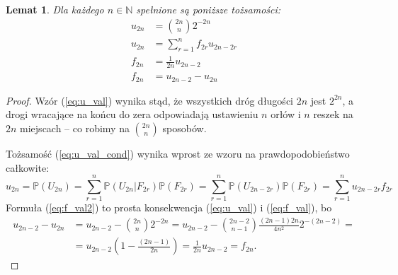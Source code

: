 \documentclass[a4paper,11pt,oneside]{book}
\newcommand{\Prob}{\mathbb{P}}
\newtheorem{lemat}[twier]{Lemat}
\begin{document}
\begin{lemat}
 \label{lem:uf_val}
 Dla każdego $n \in \mathbb{N}$ spełnione są poniższe tożsamości:
 \begin{align}
  u_{2n} &= \binom{2n}{n}2^{-2n}   \label{eq:u_val}\\
  u_{2n} &= \sum_{r=1}^n f_{2r} u_{2n-2r}   \label{eq:u_val_cond}\\
  f_{2n} &= \frac{1}{2n} u_{2n-2} \label{eq:f_val}\\
  f_{2n} &= u_{2n-2} - u_{2n} \label{eq:f_val2}
 \end{align}
\end{lemat}
\begin{proof}
 Wzór (\ref{eq:u_val}) wynika stąd, że wszystkich dróg długości $2n$ jest $2^{2n}$, a drogi wracające na końcu do zera odpowiadają ustawieniu $n$ orłów i $n$ reszek na $2n$ miejscach -- co robimy na $\binom{2n}{n}$ sposobów.
 
 Tożsamość (\ref{eq:u_val_cond}) wynika wprost ze wzoru na prawdopodobieństwo całkowite:
 \[ u_{2n} = \Prob(U_{2n}) = \sum_{r=1}^n \Prob(U_{2n}|F_{2r}) \Prob(F_{2r}) = \sum_{r=1}^n \Prob(U_{2n-2r}) \Prob(F_{2r}) = \sum_{r=1}^n u_{2n-2r}f_{2r}  \]
 Formuła (\ref{eq:f_val2}) to prosta konsekwencja (\ref{eq:u_val}) i (\ref{eq:f_val}), bo
 \begin{equation*}
 \begin{split}
    u_{2n-2} - u_{2n} &= u_{2n-2} - \binom{2n}{n}2^{-2n} =  u_{2n-2} - \binom{2n-2}{n-1} \frac{(2n-1)2n}{4n^2}2^{-(2n-2)} = \\
    &= u_{2n-2}\left(1 - \frac{(2n-1)}{2n} \right) = \frac{1}{2n} u_{2n-2} =  f_{2n}.
 \end{split}
 \end{equation*}
\end{proof}
\end{document}
